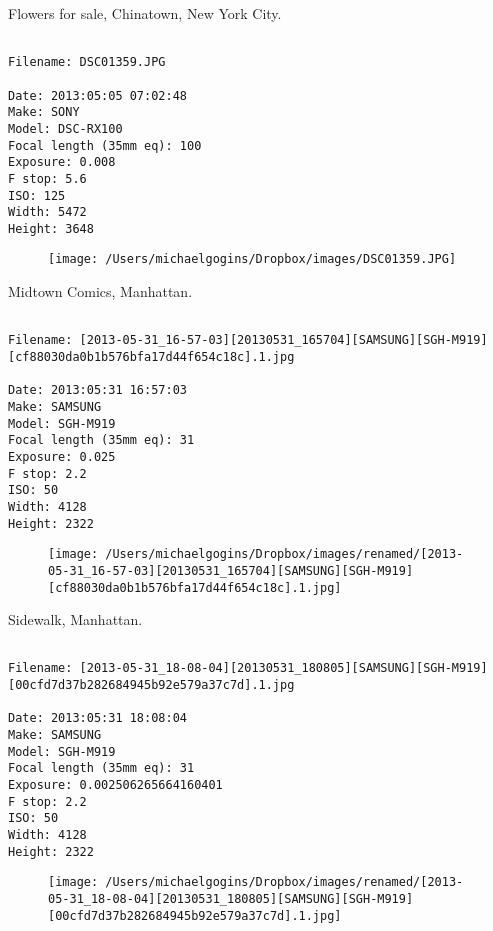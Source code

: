 \documentclass[11pt,letter,DIV=14,paper=landscape]{scrbook}
\begin{document}
\clearpage
\noindent Flowers for sale, Chinatown, New York City.
\noindent
\begin{lstlisting}

Filename: DSC01359.JPG

Date: 2013:05:05 07:02:48
Make: SONY
Model: DSC-RX100
Focal length (35mm eq): 100
Exposure: 0.008
F stop: 5.6
ISO: 125
Width: 5472
Height: 3648
\end{lstlisting}
\clearpage

\begin{figure}
\texttt{[image: /Users/michaelgogins/Dropbox/images/DSC01359.JPG]}
\end{figure}
    
\clearpage
\noindent Midtown Comics, Manhattan.
\noindent
\begin{lstlisting}

Filename: [2013-05-31_16-57-03][20130531_165704][SAMSUNG][SGH-M919][cf88030da0b1b576bfa17d44f654c18c].1.jpg

Date: 2013:05:31 16:57:03
Make: SAMSUNG
Model: SGH-M919
Focal length (35mm eq): 31
Exposure: 0.025
F stop: 2.2
ISO: 50
Width: 4128
Height: 2322
\end{lstlisting}
\clearpage

\begin{figure}
\texttt{[image: /Users/michaelgogins/Dropbox/images/renamed/[2013-05-31\_16-57-03][20130531\_165704][SAMSUNG][SGH-M919][cf88030da0b1b576bfa17d44f654c18c].1.jpg]}
\end{figure}
    
\clearpage
\noindent Sidewalk, Manhattan.
\noindent
\begin{lstlisting}

Filename: [2013-05-31_18-08-04][20130531_180805][SAMSUNG][SGH-M919][00cfd7d37b282684945b92e579a37c7d].1.jpg

Date: 2013:05:31 18:08:04
Make: SAMSUNG
Model: SGH-M919
Focal length (35mm eq): 31
Exposure: 0.002506265664160401
F stop: 2.2
ISO: 50
Width: 4128
Height: 2322
\end{lstlisting}
\clearpage

\begin{figure}
\texttt{[image: /Users/michaelgogins/Dropbox/images/renamed/[2013-05-31\_18-08-04][20130531\_180805][SAMSUNG][SGH-M919][00cfd7d37b282684945b92e579a37c7d].1.jpg]}
\end{figure}
    
\end{document}
